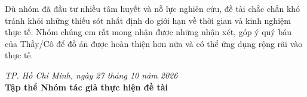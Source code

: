 Dù nhóm đã đầu tư nhiều tâm huyết và nỗ lực nghiên cứu, đề tài chắc chắn khó tránh khỏi những thiếu sót nhất định do giới hạn về thời gian và kinh nghiệm thực tế. Nhóm chúng em rất mong nhận được những nhận xét, góp ý quý báu của Thầy/Cô để đồ án được hoàn thiện hơn nữa và có thể ứng dụng rộng rãi vào thực tế.

\vspace{1.5cm}
\begin{flushright}
    \textit{TP. Hồ Chí Minh, ngày 27 tháng 10 năm 2026}\\[0.3cm]
    \textbf{Tập thể Nhóm tác giả thực hiện đề tài}
\end{flushright}

